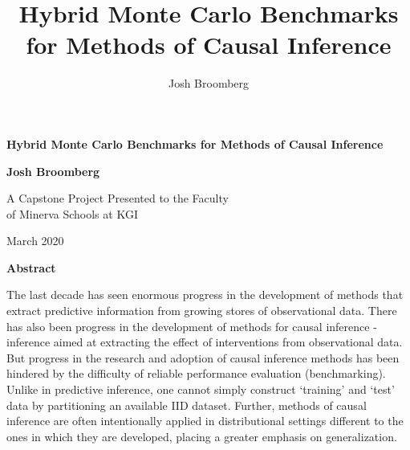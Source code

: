 \documentclass[../main.tex]{subfiles}
\newcommand{\paperTitleText}{Hybrid Monte Carlo Benchmarks for Methods of Causal Inference}
\begin{document}
    \title{\paperTitleText}
    \author{Josh Broomberg}

    \begin{titlepage}
        \begin{center}
            \vspace*{1cm}
                
            \Huge
            \textbf{\paperTitleText}
                
            \vspace{2cm}
            
            \huge
            \textbf{Josh Broomberg}
                
            \vfill
            
            \Large
            A Capstone Project Presented to the Faculty \\
            of Minerva Schools at KGI
                
            \vspace{0.8cm}
                
            March 2020
                
        \end{center}
    \end{titlepage}
    
    \thispagestyle{plain}
    \begin{center}
        \Large
        \textbf{Abstract}
        \vspace{1cm}
    \end{center}
    
    The last decade has seen enormous progress in the development of methods that extract predictive information from growing stores of observational data. There has also been progress in the development of methods for causal inference - inference aimed at extracting the effect of interventions from observational data. But progress in the research and adoption of causal inference methods has been hindered by the difficulty of reliable performance evaluation (benchmarking). Unlike in predictive inference, one cannot simply construct ‘training’ and ‘test’ data by partitioning an available IID dataset. Further, methods of causal inference are often intentionally applied in distributional settings different to the ones in which they are developed, placing a greater emphasis on generalization.
    
\end{document}
